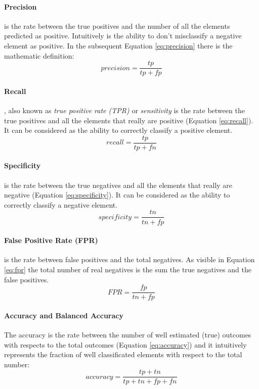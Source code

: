 \documentclass{standalone}
\begin{document}
\paragraph{Precision}
is the rate between the true positives and the number of all the elements predicted as positive. Intuitively is the ability to don't misclassify a negative element as positive. In the subsequent Equation \ref{eq:precision} there is the mathematic definition:
\begin{equation} \label{eq:precision}
    precision = \frac{tp}{tp+fp}
\end{equation} 


\paragraph{Recall}
, also known as \textit{true positive rate (TPR)} or \textit{sensitivity} is the rate between the true positives and all the elements that really are positive (Equation \ref{eq:recall}). It can be considered as the ability to correctly classify a positive element.
\begin{equation} \label{eq:recall}
    recall = \frac{tp}{tp+fn}
\end{equation} 

\paragraph{Specificity}
is the rate between the true negatives and all the elements that really are negative (Equation \ref{eq:specificity}). It can be considered as the ability to correctly classify a negative element.
\begin{equation} \label{eq:specificity}
    specificity = \frac{tn}{tn+fp}
\end{equation} 



\paragraph{False Positive Rate (FPR)}
is the rate between false positives and the total negatives. As visible in Equation \ref{eq:fpr} the total number of real negatives is the sum the true negatives and the false positives.
\begin{equation} \label{eq:fpr}
    FPR = \frac{fp}{tn+fp}
\end{equation} 


\paragraph{Accuracy and Balanced Accuracy}
The accuracy is the rate between the number of well estimated (true) outcomes with respects to the total outcomes (Equation \ref{eq:accuracy}) and it intuitively represents the fraction of well classificated elements with respect to the total number:
\begin{equation}
\label{eq:accuracy}
    accuracy = \frac{tp + tn}{tp + tn + fp + fn}
\end{equation}
\end{document}
